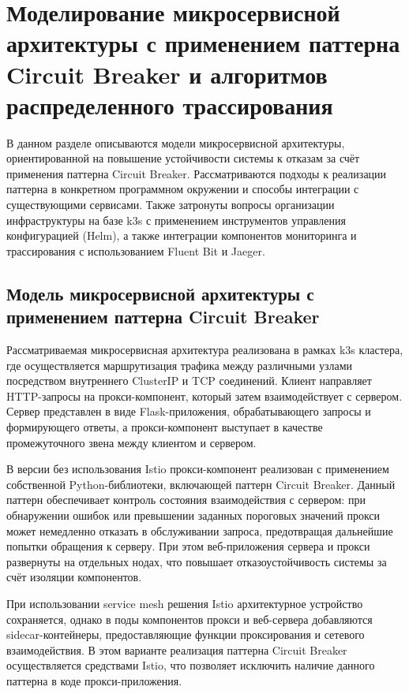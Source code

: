 \chapter{Моделирование микросервисной архитектуры с применением паттерна Circuit Breaker и алгоритмов распределенного трассирования}


В данном разделе описываются модели микросервисной архитектуры, ориентированной на повышение устойчивости системы к отказам за счёт применения паттерна Circuit Breaker. Рассматриваются подходы к реализации паттерна в конкретном программном окружении и способы интеграции с существующими сервисами. Также затронуты вопросы организации инфраструктуры на базе k3s с применением инструментов управления конфигурацией (Helm), а также интеграции компонентов мониторинга и трассирования с использованием Fluent Bit и Jaeger. 

  
\section{Модель микросервисной архитектуры с применением паттерна Circuit Breaker}
  

Рассматриваемая микросервисная архитектура реализована в рамках k3s кластера, где осуществляется маршрутизация трафика между различными узлами посредством внутреннего ClusterIP и TCP соединений. Клиент направляет HTTP-запросы на прокси-компонент, который затем взаимодействует с сервером. Сервер представлен в виде Flask-приложения, обрабатывающего запросы и формирующего ответы, а прокси-компонент выступает в качестве промежуточного звена между клиентом и сервером.

В версии без использования Istio прокси-компонент реализован с применением собственной Python-библиотеки, включающей паттерн Circuit Breaker. Данный паттерн обеспечивает контроль состояния взаимодействия с сервером: при обнаружении ошибок или превышении заданных пороговых значений прокси может немедленно отказать в обслуживании запроса, предотвращая дальнейшие попытки обращения к серверу. При этом веб-приложения сервера и прокси развернуты на отдельных нодах, что повышает отказоустойчивость системы за счёт изоляции компонентов.

При использовании service mesh решения Istio архитектурное устройство сохраняется, однако в поды компонентов прокси и веб-сервера добавляются sidecar-контейнеры, предоставляющие функции проксирования и сетевого взаимодействия. В этом варианте реализация паттерна Circuit Breaker осуществляется средствами Istio, что позволяет исключить наличие данного паттерна в коде прокси-приложения. 

